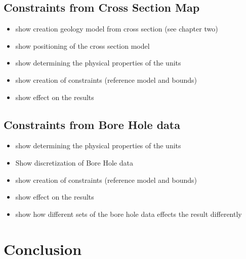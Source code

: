 \subsection{Constraints from Cross Section Map}
\label{sec:crossSectTKC}

\begin{itemize}
\item show creation  geology model from cross section (see chapter two)
\item show positioning of the cross section model
\item show determining the physical properties of the units
\item show creation of constraints (reference model and bounds)
\item show effect on the results
\end{itemize}

\subsection{Constraints from Bore Hole data}
\label{sec:BHTKC}

\begin{itemize}
\item show determining the physical properties of the units
\item Show discretization of Bore Hole data
\item show creation of constraints (reference model and bounds)
\item show effect on the results
\item show how different sets of the bore hole data effects the result differently
\end{itemize}

\section{Conclusion}
\label{sec:ConclusionTKC}


%
%
%
%
%


